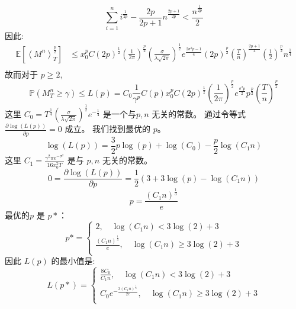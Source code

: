  \begin{equation}
 \sum_{i=1}^{n}i^{\frac{1}{2p}}-\frac{2p}{2p+1}n^{\frac{2p+1}{2p}}<\frac{n^{\frac{1}{2p}}}{2}
 \end{equation}
 因此:
 \begin{equation}
 \begin{split}
 \mathbb{E}[\left \langle M^n \right \rangle_T^{\frac{p}{2}}]
 &\leq x_0^pC(2p)^{\frac{1}{2}}(\frac{1}{2\pi})^{\frac{p}{2}}(\frac{\sigma}{\lambda\sqrt{2\pi}})^{\frac{1}{2}}e^{\frac{2\sigma^2p-1}{4}}
 (2p)^{\frac{p}{2}}(\frac{T}{n})^{\frac{2p+1}{4}}(\frac{1}{2})^{\frac{p}{2}}n^{\frac{1}{4}}\\
 \end{split}
 \end{equation}
 故而对于 $p\geq 2$,
 \begin{equation}
 \mathbb{P}(M_T^n\geq \gamma)\leq L(p)=C_0\frac{1}{\gamma^p}C(p)x_0^pC(2p)^{\frac{1}{2}}(\frac{1}{2\pi})^{\frac{p}{2}}e^{\frac{\sigma^2p}{2}}
 p^{\frac{p}{2}}(\frac{T}{n})^{\frac{p}{2}}
 \end{equation}
 这里
 $C_0=T^{\frac{1}{4}}(\frac{\sigma}{\lambda\sqrt{2\pi}})^{\frac{1}{2}}e^{-\frac{1}{4}}$ 是一个与$p, n$ 无关的常数。  
 通过令等式 $\frac{\partial \log(L(p))}{\partial p}=0$ 成立。 我们找到最优的 $p$。
 \begin{equation}
 \log(L(p))=\frac{3}{2}p\log(p)+\log(C_0)-\frac{p}{2}\log(C_1n)
 \end{equation}
 这里 $C_1=\frac{\gamma^2\pi e^{-\sigma^2}}{16x_0^2T}$ 是与 $p, n$ 无关的常数。
 \begin{equation}
 0=\frac{\partial\log(L(p))}{\partial p}=\frac{1}{2}(3+3\log(p)-\log(C_1n)) 
 \end{equation}
 \begin{equation}
 p=\frac{(C_1n)^{\frac{1}{3}}}{e}
 \end{equation}
 最优的$p$ 是 $p*$：
 \begin{equation}
 p*=
 \begin{cases}
 2, \quad  \log(C_1n)<3\log(2)+3\\
 \frac{(C_1n)^{\frac{1}{3}}}{e}, \quad \log(C_1n)\geq 3\log(2)+3\\
 \end{cases}
 \end{equation}
 因此 $L(p)$ 的最小值是:
 \begin{equation}
 L(p*)=
 \begin{cases}
 \frac{8C_0}{C_1n}, \quad \log(C_1n)<3\log(2)+3\\
 C_0e^{-\frac{3(C_1n)^{\frac{1}{3}}}{2e}}, \quad \log(C_1n)\geq 3\log(2)+3\\
 \end{cases}
 \end{equation}
